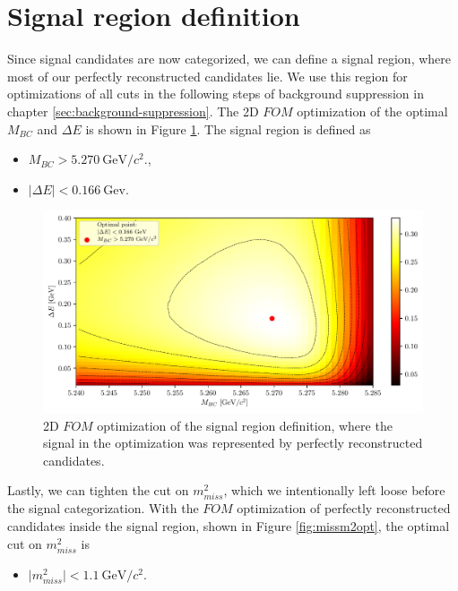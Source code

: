 \documentclass[headings=standardclasses,headings=big,oneside,a4paper,openany,12pt]{scrbook}
\newcommand {\e}[1]{\mathrm{~#1}}
\begin{document}
\section{Signal region definition}

Since signal candidates are now categorized, we can define a signal region, where most of our perfectly reconstructed candidates lie. We use this region for optimizations of all cuts in the following steps of background suppression in chapter \ref{sec:background-suppression}. The 2D $FOM$ optimization of the optimal $M_{BC}$ and $\Delta E$ is shown in Figure \ref{fig:sigwin}.
The signal region is defined as
\begin{itemize}
\item $M_{BC} > 5.270\e{GeV}/c^2.$,
\item $\vert \Delta E \vert < 0.166\e{Gev}$. 
\end{itemize}

\begin{figure}[H]
\centering
\captionsetup{width=0.8\linewidth}
\includegraphics[width=\linewidth]{fig/sigWin}
\caption{2D $FOM$ optimization of the signal region definition, where the signal in the optimization was represented by perfectly reconstructed candidates.}
\label{fig:sigwin}
\end{figure}

Lastly, we can tighten the cut on $m_{miss}^2$, which we intentionally left loose before the signal categorization. With the $FOM$ optimization of perfectly reconstructed candidates inside the signal region, shown in Figure \ref{fig:missm2opt}, the optimal cut on $m_{miss}^2$ is 

\begin{itemize}
\item $\vert m_{miss}^2 \vert < 1.1\e{GeV}/c^2$.
\end{itemize}
\end{document}
